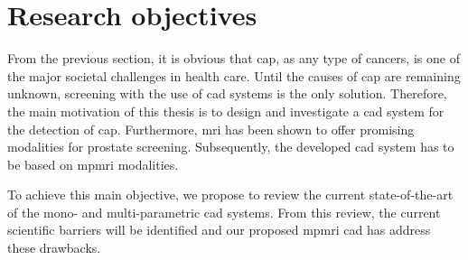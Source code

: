 \section{Research objectives}\label{sec:intro:motivation}


From the previous section, it is obvious that \ac{cap}, as any type of cancers, is one of the major societal challenges in health care.
Until the causes of \ac{cap} are remaining unknown, screening with the use of \ac{cad} systems is the only solution.
Therefore, the main motivation of this thesis is to design and investigate a \ac{cad} system for the detection of \ac{cap}.
Furthermore, \ac{mri} has been shown to offer promising modalities for prostate screening.
Subsequently, the developed \ac{cad} system has to be based on \ac{mpmri} modalities.

To achieve this main objective, we propose to review the current state-of-the-art of the mono- and multi-parametric \ac{cad} systems.
From this review, the current scientific barriers will be identified and our proposed \ac{mpmri} \ac{cad} has address these drawbacks.